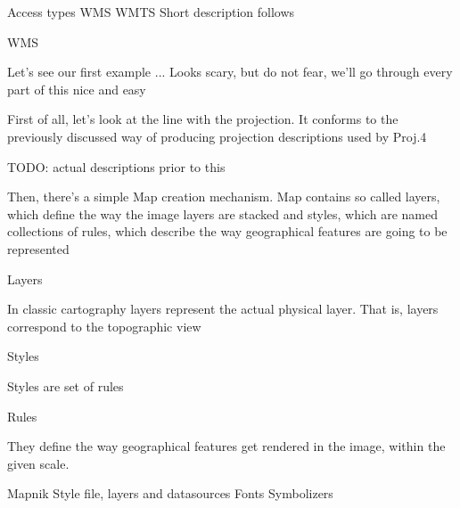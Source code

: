 \documentclass{beamer}
\begin{document}
\begin{frame}{Access types}
  WMS
  WMTS
  Short description follows
\end{frame}

\begin{frame}{WMS}

\end{frame}

Let's see our first example
...
Looks scary, but do not fear, we'll go through every part of this nice and easy

First of all, let's look at the line with the projection. It conforms to the
previously discussed way of producing projection descriptions used by Proj.4

TODO: actual descriptions prior to this

Then, there's a simple Map creation mechanism. Map contains so called layers,
which define the way the image layers are stacked and styles, which are named
collections of rules, which describe the way geographical features are going
to be represented

Layers

In classic cartography layers represent the actual physical layer. That is,
layers correspond to the topographic view

Styles

Styles are set of rules

Rules

They define the way geographical features get rendered in the image, within
the given scale.




Mapnik
Style file, layers and datasources
Fonts
Symbolizers
\end{document}

